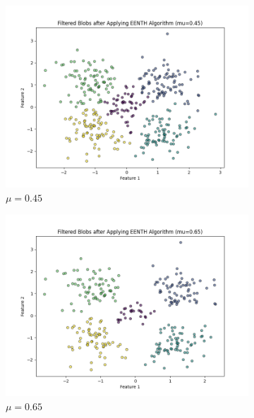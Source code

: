 \begin{figure}[htbp]
	\centering
	\begin{subfigure}[b]{0.3\textwidth}
		\centering
		\includegraphics[width=\textwidth]{figures/eenth/filtered_blobs_mu_0.45}
		\caption{$\mu = 0.45$}
		\label{fig:mu0.45}
	\end{subfigure}
	\hfill
	\begin{subfigure}[b]{0.3\textwidth}
		\centering
		\includegraphics[width=\textwidth]{figures/eenth/filtered_blobs_mu_0.65}
		\caption{$\mu = 0.65$}
		\label{fig:mu0.65}
	\end{subfigure}
	\hfill
	\begin{subfigure}[b]{0.3\textwidth}

\end{subfigure}
\end{figure}
